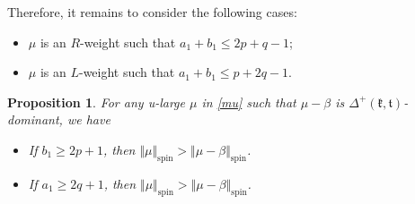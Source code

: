 \documentclass[11pt]{amsart}
\theoremstyle{plain}
\newtheorem{prop}[thm]{Proposition}
\theoremstyle{definition}
\newcommand{\frk}{\mathfrak{k}}
\newcommand{\frt}{\mathfrak{t}}
\begin{document}
Therefore, it remains to consider the following cases:
\begin{itemize}
	\item[$\bullet$] $\mu$ is an $R$-weight such that $a_1+b_1\le 2p+q-1$;
	\item[$\bullet$] $\mu$ is an $L$-weight such that $a_1+b_1\le p+2q-1$.
\end{itemize}



\begin{prop}\label{prop-2p+1}
	For any u-large $\mu$ in \eqref{mu} such that $\mu-\beta$ is $\Delta^+(\frk,\frt)$-dominant, we have
	\begin{itemize}
		\item[(a)] If $b_1\ge 2p+1$, then $\Vert\mu\Vert_{\mathrm{spin}}>\Vert\mu-\beta\Vert_{\mathrm{spin}}$.
		\item[(b)] If $a_1\ge 2q+1$, then $\Vert\mu\Vert_{\mathrm{spin}}>\Vert\mu-\beta\Vert_{\mathrm{spin}}$.
	\end{itemize}
\end{prop}
\end{document}
